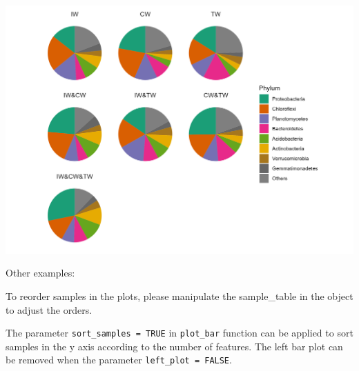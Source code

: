 \documentclass[
]{book}
\newenvironment{Shaded}{\begin{snugshade}}{\end{snugshade}}
\newcommand{\AttributeTok}[1]{\textcolor[rgb]{0.77,0.63,0.00}{#1}}
\newcommand{\CommentTok}[1]{\textcolor[rgb]{0.56,0.35,0.01}{\textit{#1}}}
\newcommand{\ConstantTok}[1]{\textcolor[rgb]{0.00,0.00,0.00}{#1}}
\newcommand{\FunctionTok}[1]{\textcolor[rgb]{0.00,0.00,0.00}{#1}}
\newcommand{\NormalTok}[1]{#1}
\newcommand{\OtherTok}[1]{\textcolor[rgb]{0.56,0.35,0.01}{#1}}
\newcommand{\SpecialCharTok}[1]{\textcolor[rgb]{0.00,0.00,0.00}{#1}}
\newcommand{\StringTok}[1]{\textcolor[rgb]{0.31,0.60,0.02}{#1}}
\begin{document}
\begin{center}\includegraphics[width=800px]{Images/trans_venn_pie} \end{center}

Other examples:

To reorder samples in the plots, please manipulate the sample\_table in the object to adjust the orders.

\begin{Shaded}
\end{Shaded}

The parameter \texttt{sort\_samples\ =\ TRUE} in \texttt{plot\_bar} function can be applied to sort samples in the y axis according to the number of features.
The left bar plot can be removed when the parameter \texttt{left\_plot\ =\ FALSE}.
\end{document}
